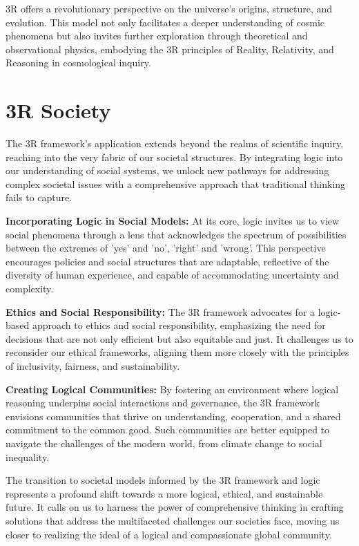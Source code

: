 \documentclass[12pt]{article}
\begin{document}
3R offers a revolutionary perspective on the universe's origins, structure, and evolution. This model not only facilitates a deeper understanding of cosmic phenomena but also invites further exploration through theoretical and observational physics, embodying the 3R principles of Reality, Relativity, and Reasoning in cosmological inquiry.

\section*{3R Society}

The 3R framework’s application extends beyond the realms of scientific inquiry, reaching into the very fabric of our societal structures. By integrating \qbit{} logic into our understanding of social systems, we unlock new pathways for addressing complex societal issues with a comprehensive approach that traditional thinking fails to capture.

\textbf{Incorporating \qbit{} Logic in Social Models:} At its core, \qbit{} logic invites us to view social phenomena through a lens that acknowledges the spectrum of possibilities between the extremes of 'yes' and 'no', 'right' and 'wrong'. This perspective encourages policies and social structures that are adaptable, reflective of the diversity of human experience, and capable of accommodating uncertainty and complexity.

\textbf{Ethics and Social Responsibility:} The 3R framework advocates for a logic-based approach to ethics and social responsibility, emphasizing the need for decisions that are not only efficient but also equitable and just. It challenges us to reconsider our ethical frameworks, aligning them more closely with the principles of inclusivity, fairness, and sustainability.

\textbf{Creating Logical Communities:} By fostering an environment where logical reasoning underpins social interactions and governance, the 3R framework envisions communities that thrive on understanding, cooperation, and a shared commitment to the common good. Such communities are better equipped to navigate the challenges of the modern world, from climate change to social inequality.

The transition to societal models informed by the 3R framework and \qbit{} logic represents a profound shift towards a more logical, ethical, and sustainable future. It calls on us to harness the power of comprehensive thinking in crafting solutions that address the multifaceted challenges our societies face, moving us closer to realizing the ideal of a logical and compassionate global community.
\end{document}
